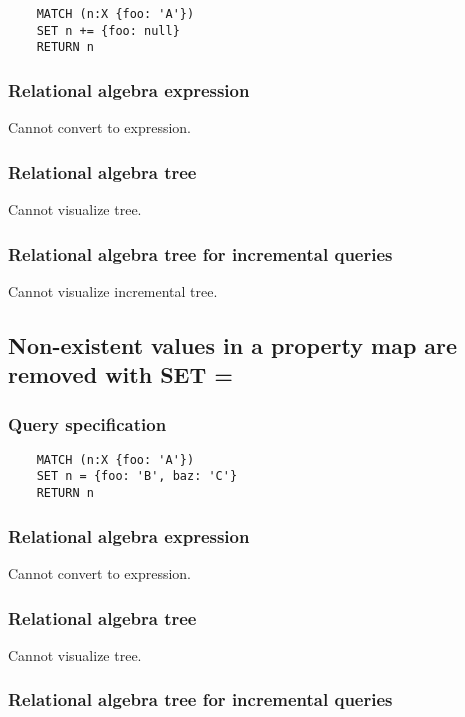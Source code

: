 	\begin{lstlisting}
	MATCH (n:X {foo: 'A'})
	SET n += {foo: null}
	RETURN n
	\end{lstlisting}


	\subsubsection*{Relational algebra expression}

	Cannot convert to expression.

	\subsubsection*{Relational algebra tree}

	Cannot visualize tree.

	\subsubsection*{Relational algebra tree for incremental queries}

	Cannot visualize incremental tree.
	\subsection{Non-existent values in a property map are removed with SET =}

	\subsubsection*{Query specification}

	\begin{lstlisting}
	MATCH (n:X {foo: 'A'})
	SET n = {foo: 'B', baz: 'C'}
	RETURN n
	\end{lstlisting}


	\subsubsection*{Relational algebra expression}

	Cannot convert to expression.

	\subsubsection*{Relational algebra tree}

	Cannot visualize tree.

	\subsubsection*{Relational algebra tree for incremental queries}


